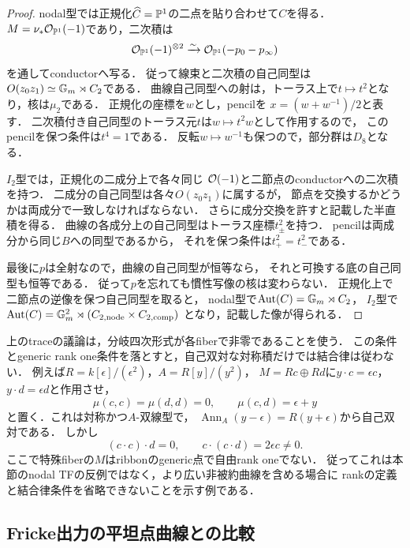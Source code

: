 \begin{proof}
nodal型では正規化$\widehat C=\mathbb P^1$の二点を貼り合わせて$C$を得る．
$M=\nu_*\mathcal O_{\mathbb P^1}(-1)$であり，二次積は
\[
 \mathcal O_{\mathbb P^1}(-1)^{\otimes2}
       \xrightarrow{\sim}\mathcal O_{\mathbb P^1}(-p_0-p_\infty)
\]
を通してconductorへ写る．
従って線束と二次積の自己同型は$O(z_0z_1)\simeq\mathbb G_m\rtimes C_2$である．
曲線自己同型への射は，トーラス上で$t\mapsto t^2$となり，核は$\mu_2$である．
正規化の座標を$w$とし，pencilを
$x=(w+w^{-1})/2$と表す．
二次積付き自己同型のトーラス元$t$は$w\mapsto t^2w$として作用するので，
このpencilを保つ条件は$t^4=1$である．
反転$w\mapsto w^{-1}$も保つので，部分群は$D_8$となる．

$I_2$型では，正規化の二成分上で各々同じ
$\mathcal O(-1)$と二節点のconductorへの二次積を持つ．
二成分の自己同型は各々$O(z_0z_1)$に属するが，
節点を交換するかどうかは両成分で一致しなければならない．
さらに成分交換を許すと記載した半直積を得る．
曲線の各成分上の自己同型はトーラス座標$t_\pm^2$を持つ．
pencilは両成分から同じ$B$への同型であるから，
それを保つ条件は$t_+^2=t_-^2$である．

最後に$p$は全射なので，曲線の自己同型が恒等なら，
それと可換する底の自己同型も恒等である．
従って$p$を忘れても慣性写像の核は変わらない．
正規化上で二節点の逆像を保つ自己同型を取ると，
nodal型で$\operatorname{Aut}(C)=\mathbb G_m\rtimes C_2$，
$I_2$型で$\operatorname{Aut}(C)=\mathbb G_m^2\rtimes(C_{2,\mathrm{node}}\times C_{2,\mathrm{comp}})$
となり，記載した像が得られる．
\end{proof}

\begin{remark}[一般ribbonを加える際に残る仮定]
\label{rem:qa-tf-associativity-ribbon-warning}
上のtraceの議論は，分岐四次形式が各fiberで非零であることを使う．
この条件とgeneric rank one条件を落とすと，自己双対な対称積だけでは結合律は従わない．
例えば$R=k[\epsilon]/(\epsilon^2)$，$A=R[y]/(y^2)$，
$M=Rc\oplus Rd$に$y\cdot c=\epsilon c$，$y\cdot d=\epsilon d$と作用させ，
\[
 \mu(c,c)=\mu(d,d)=0,\qquad\mu(c,d)=\epsilon+y
\]
と置く．これは対称かつ$A$-双線型で，
$\operatorname{Ann}_A(y-\epsilon)=R(y+\epsilon)$から自己双対である．
しかし
\[
 (c\cdot c)\cdot d=0,
 \qquad c\cdot(c\cdot d)=2\epsilon c\ne0.
\]
ここで特殊fiberの$M$はribbonのgeneric点で自由rank oneでない．
従ってこれは本節のnodal TFの反例ではなく，より広い非被約曲線を含める場合に
rankの定義と結合律条件を省略できないことを示す例である．
\end{remark}

\subsection{Fricke出力の平坦点曲線との比較}

